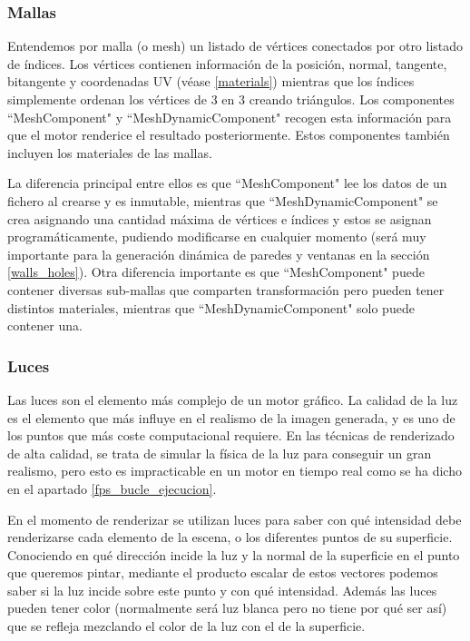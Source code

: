 \subsubsection{Mallas}
Entendemos por malla (o mesh) un listado de vértices conectados por otro listado de índices. Los vértices contienen información de la posición, normal, tangente, bitangente y coordenadas UV (véase \ref{materials}) mientras que los índices simplemente ordenan los vértices de 3 en 3 creando triángulos. Los componentes ``MeshComponent" y ``MeshDynamicComponent" recogen esta información para que el motor renderice el resultado posteriormente. Estos componentes también incluyen los materiales de las mallas.

La diferencia principal entre ellos es que ``MeshComponent" lee los datos de un fichero al crearse y es inmutable, mientras que ``MeshDynamicComponent" se crea asignando una cantidad máxima de vértices e índices y estos se asignan programáticamente, pudiendo modificarse en cualquier momento (será muy importante para la generación dinámica de paredes y ventanas en la sección \ref{walls_holes}). Otra diferencia importante es que ``MeshComponent" puede contener diversas sub-mallas que comparten transformación pero pueden tener distintos materiales, mientras que ``MeshDynamicComponent" solo puede contener una.

\subsubsection{Luces}
Las luces son el elemento más complejo de un motor gráfico. La calidad de la luz es el elemento que más influye en el realismo de la imagen generada, y es uno de los puntos que más coste computacional requiere. En las técnicas de renderizado de alta calidad, se trata de simular la física de la luz para conseguir un gran realismo, pero esto es impracticable en un motor en tiempo real como se ha dicho en el apartado \ref{fps_bucle_ejecucion}.

En el momento de renderizar se utilizan luces para saber con qué intensidad debe renderizarse cada elemento de la escena, o los diferentes puntos de su superficie. Conociendo en qué dirección incide la luz y la normal de la superficie en el punto que queremos pintar, mediante el producto escalar de estos vectores podemos saber si la luz incide sobre este punto y con qué intensidad. Además las luces pueden tener color (normalmente será luz blanca pero no tiene por qué ser así) que se refleja mezclando el color de la luz con el de la superficie.

